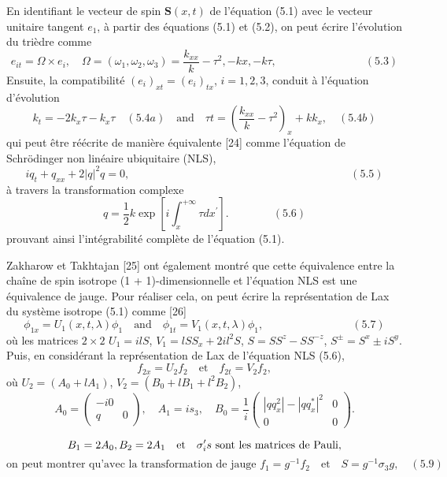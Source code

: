 \documentclass{article}
\begin{document}
   En identifiant le vecteur de spin \(\mathbf{S}(x, t)\) de l'équation (5.1) avec le vecteur unitaire tangent \(e_1\), à partir des équations (5.1) et (5.2), on peut écrire l'évolution du trièdre comme
   \[
   e_{it} = \varOmega \times e_i, \quad \varOmega = (\omega_1, \omega_2, \omega_3) = \frac{k_{xx}}{k} - \tau^2, -kx, -k\tau, \qquad \qquad \qquad \qquad (5.3)
   \]
   Ensuite, la compatibilité \((e_i)_{xt} = (e_i)_{tx}\), \(i = 1,2,3\), conduit à l'équation d'évolution
    \[
   k_t = -2k_{x}\tau - k_{x}\tau \quad (5.4a) \quad \text{and} \quad \tau t = \left( \frac{k_{xx}}{k} - \tau^2\right)_x + kk_x, \quad (5.4b)
   \]
   qui peut être réécrite de manière équivalente [24] comme l'équation de Schrödinger non linéaire ubiquitaire (NLS),
   \[
   iq_t + q_{xx} + 2|q|^2q = 0, \qquad \qquad \qquad \qquad \qquad \qquad \qquad \qquad \qquad \qquad  (5.5)
   \]
   à travers la transformation complexe
   \[
   q = \frac{1}{2} k \exp\left[i \int_{x}^{+\infty} \tau dx^{'} \right]. \qquad \qquad  (5.6)
   \]
   prouvant ainsi l'intégrabilité complète de l'équation (5.1).
   
   Zakharow et Takhtajan [25] ont également montré que cette équivalence entre la chaîne de spin isotrope (1 + 1)-dimensionnelle et l'équation NLS est une équivalence de jauge. Pour réaliser cela, on peut écrire la représentation de Lax du système isotrope (5.1) comme [26]
    \[
   \phi_{1x} = U_1(x, t, \lambda) \phi_1 \quad \text{and} \quad \phi_{1t} = V_1(x, t, \lambda)\phi_1, \qquad \qquad \qquad \qquad (5.7)
   \]
   où les matrices \(2 \times 2\) \(U_1 = ilS\), \(V_1 = lS S_x + 2il^2 S\), \(S = S S^z - S S^{-z}\), \(S^{\pm} = S^x \pm iS^y\). Puis, en considérant la représentation de Lax de l'équation NLS (5.6),
   \[
   f_{2x} = U_2 f_2 \quad \text{et} \quad f_{2t} = V_2 f_2,
   \]
   où \(U_2 = (A_0 + lA_1)\), \(V_2 = (B_0 + lB_1 + l^2 B_2)\),
   \[
   A_0 = \begin{pmatrix} -i 0 \\ q & 0 \end{pmatrix}, \quad A_1 = i s_3, \quad B_0 = \frac{1}{i} \begin{pmatrix} |qq_{x}^{2}| - |qq_{x}^{*}|^2 & 0 \\ 0 & 0 \end{pmatrix}.
   \]
   
   \[ 
   B_1 = 2A_0, \\
   B_2 = 2A_1 \quad \text{et} \quad \sigma_i's \text{ sont les matrices de Pauli},
   \]
   \[ 
   \text{on peut montrer qu'avec la transformation de jauge } f_1 = g^{-1} f_2 \quad \text{et} \quad S = g^{-1} \sigma_3 g, \quad (5.9)
   \]
    
\end{document}
